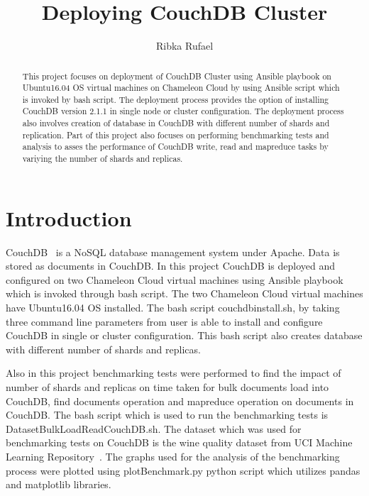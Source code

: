 \title{Deploying CouchDB Cluster}


\author{Ribka Rufael}
\orcid{}



\renewcommand{\shortauthors}{R. Rufael}


\begin{abstract}
  This project focuses on deployment of CouchDB Cluster using Ansible
  playbook on Ubuntu16.04 OS virtual machines on Chameleon Cloud by
  using Ansible script which is invoked by bash script. The deployment
  process provides the option of installing CouchDB version 2.1.1 in single node or
  cluster configuration. The deployment process also involves creation
  of database in CouchDB with different number of shards and replication. Part of this project
  also focuses on performing  benchmarking tests and analysis to asses the
  performance of CouchDB write, read and mapreduce tasks by variying
  the number of shards and replicas. 
\end{abstract}



\maketitle

\section{Introduction}

CouchDB~\cite{www-Couchdb} is a NoSQL database management system
under Apache. Data is stored as documents in CouchDB. In this project
CouchDB is deployed and configured on two Chameleon Cloud virtual machines using
Ansible playbook which is invoked through bash script. The two Chameleon
Cloud virtual machines have Ubuntu16.04 OS installed. The bash script
couchdbinstall.sh, by taking three command line parameters from user is
able to install and configure CouchDB in single or cluster
configuration.  This bash script also creates database with different
number of shards and replicas. 

Also in this project benchmarking tests were performed to find the
impact of number of shards and replicas on time taken for bulk
documents load into CouchDB, find documents operation and mapreduce
operation on documents in CouchDB. The bash script which is used to run the
benchmarking tests is DatasetBulkLoadReadCouchDB.sh.  The dataset which
was used for benchmarking tests on CouchDB is the wine quality dataset
from UCI Machine Learning Repository~\cite{www-WineQuality}. The
graphs used for the analysis of the benchmarking process were plotted
using plotBenchmark.py python script which utilizes pandas and
matplotlib libraries.

